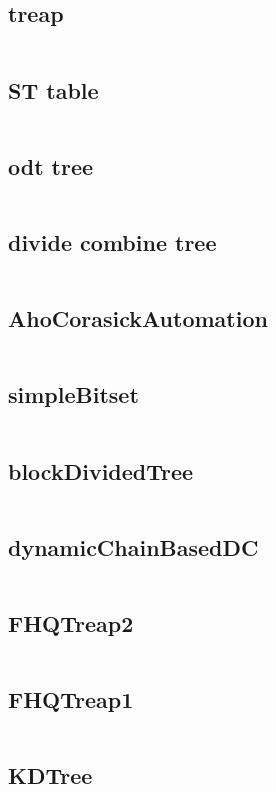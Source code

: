   \subsection{treap}
    \inputminted{cpp}{../code/data_structure/treap.cpp}
  \subsection{ST table}
    \inputminted{cpp}{../code/data_structure/ST_table.cpp}
  \subsection{odt tree}
    \inputminted{cpp}{../code/data_structure/odt_tree.cpp}
  \subsection{divide combine tree}
    \inputminted{cpp}{../code/data_structure/divide_combine_tree.cpp}
  \subsection{AhoCorasickAutomation}
    \inputminted{cpp}{../code/data_structure/AhoCorasickAutomation.cpp}
  \subsection{simpleBitset}
    \inputminted{cpp}{../code/data_structure/simpleBitset.cpp}
  \subsection{blockDividedTree}
    \inputminted{cpp}{../code/data_structure/blockDividedTree.cpp}
  \subsection{dynamicChainBasedDC}
    \inputminted{cpp}{../code/data_structure/dynamicChainBasedDC.cpp}
  \subsection{FHQTreap2}
    \inputminted{cpp}{../code/data_structure/FHQTreap2.cpp}
  \subsection{FHQTreap1}
    \inputminted{cpp}{../code/data_structure/FHQTreap1.cpp}
  \subsection{KDTree}
    \inputminted{cpp}{../code/data_structure/KDTree.cpp}
